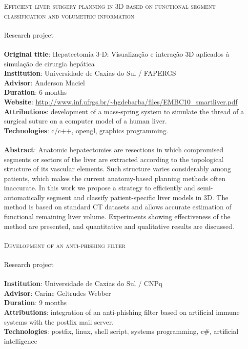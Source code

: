 \noindent
\textsc
    {\Large Efficient liver surgery planning in 3D based on functional segment
    classification and volumetric information} \\\\
Research project \\\\
\textbf{Original title}:
    Hepatectomia 3-D: Visualização e interação 3D aplicados à simulação
    de cirurgia hepática \\
\textbf{Institution}: Universidade de Caxias do Sul / FAPERGS \\
\textbf{Advisor}: Anderson Maciel \\
\textbf{Duration}: 6 months \\
\textbf{Website}:
    \url{http://www.inf.ufrgs.br/~hgdebarba/files/EMBC10_smartliver.pdf} \\
\textbf{Attributions}:
    development of a mass-spring system to simulate the thread of a surgical
    suture on a computer model of a human liver.  \\
\textbf{Technologies}: c/c++, opengl, graphics programming. \\\\
\textbf{Abstract}:
    Anatomic hepatectomies are resections in which compromised segments or
    sectors of the liver are extracted according to the topological structure
    of its vascular elements. Such structure varies considerably among
    patients, which makes the current anatomy-based planning methods often
    inaccurate. In this work we propose a strategy to efficiently and
    semi-automatically segment and classify patient-specific liver models in
    3D. The method is based on standard CT datasets and allows accurate
    estimation of functional remaining liver volume. Experiments showing
    effectiveness of the method are presented, and quantitative and qualitative
    results are discussed. \\\\

\noindent
\textsc{\Large Development of an anti-phishing filter} \\\\
Research project \\\\
\textbf{Institution}: Universidade de Caxias do Sul / CNPq \\
\textbf{Advisor}: Carine Geltrudes Webber \\
\textbf{Duration}: 9 months \\
\textbf{Attributions}:
    integration of an anti-phishing filter based on artificial immune systems
    with the postfix mail server. \\
\textbf{Technologies}:
    postfix, linux, shell script, systems programming, c\#, artificial
    intelligence \\\\

